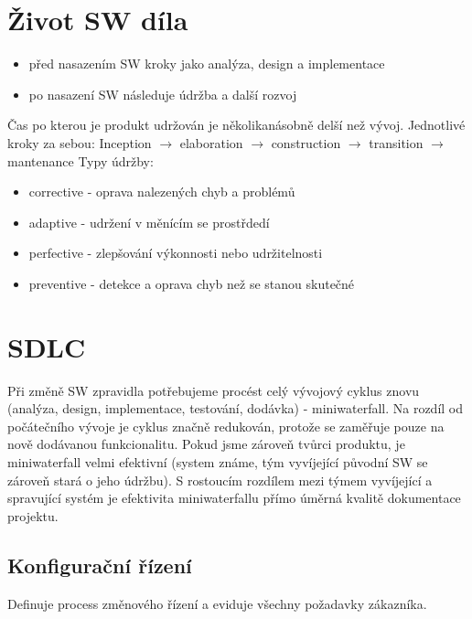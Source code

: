 \documentclass{szzclass}
\begin{document}
\tableofcontents
\newpage

\section{Život SW díla}
\begin{itemize}
    \item před nasazením SW kroky jako analýza, design a implementace
    \item po nasazení SW následuje údržba a další rozvoj
\end{itemize}
Čas po kterou je produkt udržován je několikanásobně delší než vývoj. Jednotlivé kroky za sebou:
\newline
Inception $\rightarrow$ elaboration $\rightarrow$ construction $\rightarrow$ transition $\rightarrow$ mantenance
\newline
Typy údržby:
\begin{itemize}
    \item corrective - oprava nalezených chyb a problémů
    \item adaptive - udržení v měnícím se prostřdedí
    \item perfective - zlepšování výkonnosti nebo udržitelnosti
    \item preventive - detekce a oprava chyb než se stanou skutečné
\end{itemize}

\section{SDLC}
Při změně SW zpravidla potřebujeme procést celý vývojový cyklus znovu (analýza, design, implementace, testování, dodávka) - miniwaterfall.
\newline
Na rozdíl od počátečního vývoje je cyklus značně redukován, protože se zaměřuje pouze na nově dodávanou funkcionalitu.
\newline
Pokud jsme zároveň tvůrci produktu, je miniwaterfall velmi efektivní (system známe, tým vyvíjející původní SW se zároveň stará o jeho údržbu).
\newline
S rostoucím rozdílem mezi týmem vyvíjející a spravující systém je efektivita miniwaterfallu přímo úměrná kvalitě dokumentace projektu.

\subsection{Konfigurační řízení}
Definuje process změnového řízení a eviduje všechny požadavky zákazníka.
\end{document}
